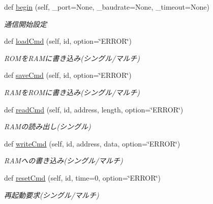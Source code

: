 \begin{DoxyCompactItemize}
\item 
def \hyperlink{classkondoServoLib_1_1b3mCtrl_07_xE3_x82_xB3_xE3_x83_x94_xE3_x83_xBC_08_1_1B3mClass_a1252a9de80537da4ea39d8b79e595f4f}{begin} (self, \+\_\+port=None, \+\_\+baudrate=None, \+\_\+timeout=None)
\begin{DoxyCompactList}\small\item\em 通信開始設定 \end{DoxyCompactList}\item 
def \hyperlink{classkondoServoLib_1_1b3mCtrl_07_xE3_x82_xB3_xE3_x83_x94_xE3_x83_xBC_08_1_1B3mClass_afdadbab52ffc1bfd82b400f8df29a54f}{load\+Cmd} (self, id, option=\char`\"{}E\+R\+R\+OR\char`\"{})
\begin{DoxyCompactList}\small\item\em R\+O\+Mを\+R\+A\+Mに書き込み(シングル/マルチ) \end{DoxyCompactList}\item 
def \hyperlink{classkondoServoLib_1_1b3mCtrl_07_xE3_x82_xB3_xE3_x83_x94_xE3_x83_xBC_08_1_1B3mClass_a6b1853c66d7addd2090823c3a3837792}{save\+Cmd} (self, id, option=\char`\"{}E\+R\+R\+OR\char`\"{})
\begin{DoxyCompactList}\small\item\em R\+A\+Mを\+R\+O\+Mに書き込み(シングル/マルチ) \end{DoxyCompactList}\item 
def \hyperlink{classkondoServoLib_1_1b3mCtrl_07_xE3_x82_xB3_xE3_x83_x94_xE3_x83_xBC_08_1_1B3mClass_a99f249f885c3b4765383e67666720160}{read\+Cmd} (self, id, address, length, option=\char`\"{}E\+R\+R\+OR\char`\"{})
\begin{DoxyCompactList}\small\item\em R\+A\+Mの読み出し(シングル) \end{DoxyCompactList}\item 
def \hyperlink{classkondoServoLib_1_1b3mCtrl_07_xE3_x82_xB3_xE3_x83_x94_xE3_x83_xBC_08_1_1B3mClass_ab105d7d42e31d00370ebe043057a98ec}{write\+Cmd} (self, id, address, data, option=\char`\"{}E\+R\+R\+OR\char`\"{})
\begin{DoxyCompactList}\small\item\em R\+A\+Mへの書き込み(シングル/マルチ) \end{DoxyCompactList}\item 
def \hyperlink{classkondoServoLib_1_1b3mCtrl_07_xE3_x82_xB3_xE3_x83_x94_xE3_x83_xBC_08_1_1B3mClass_a559506a0d8f00a75ac724d99c8849707}{reset\+Cmd} (self, id, time=0, option=\char`\"{}E\+R\+R\+OR\char`\"{})
\begin{DoxyCompactList}\small\item\em 再起動要求(シングル/マルチ) \end{DoxyCompactList}\item 

\end{DoxyCompactItemize}

